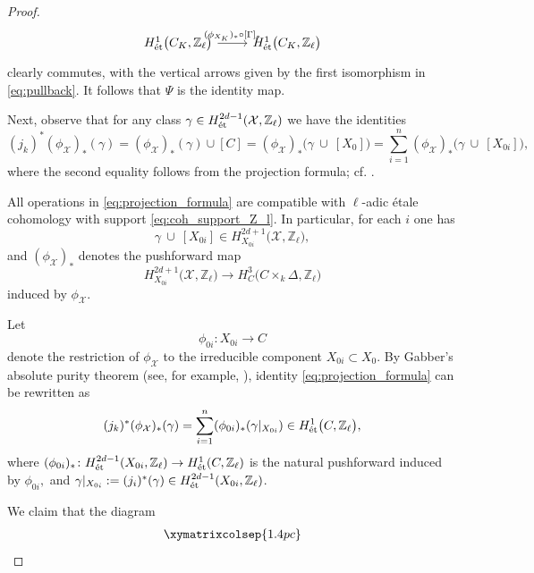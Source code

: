 \documentclass[11pt,letterpaper]{amsart}
\newcommand{\et}{\textnormal{\'et}}
\numberwithin{equation}{section}
\theoremstyle{definition}
\theoremstyle{remark}
\newcommand{\Z}{\mathbb{Z}}
\begin{document}
\begin{proof}
\begin{equation*}
\begin{tikzcd}
{H^{1}_{\et}\bigl(C_{K},\Z_\ell\bigr)} \arrow[r, "{(\phi_{X_{K}})_{\ast}\circ[\Gamma]_{\ast}}"] & {H^{1}_{\et}\bigl(C_{K},\Z_\ell\bigr)} \end{tikzcd}
\end{equation*}
clearly commutes, with the vertical arrows given by the first isomorphism in \eqref{eq:pullback}. It follows that $\Psi$ is the identity map.\par
Next, observe that for any class $\gamma\in H^{2d-1}_{\et}(\mathcal{X},\Z_\ell)$ we have the identities \begin{equation}\label{eq:projection_formula}(j_{k})^{\ast}(\phi_{\mathcal{X}})_{\ast}(\gamma)=(\phi_{\mathcal{X}})_{\ast}(\gamma)\cup[C]=(\phi_{\mathcal{X}})_{\ast}\bigl(\gamma\ \cup\ [X_{0}]\bigr)=\sum_{i=1}^{n}(\phi_{\mathcal{X}})_{\ast}\bigl(\gamma\ \cup\ [X_{0i}]\bigr),\end{equation}
where the second equality follows from the projection formula; cf. \cite[(1.3.3) and Example (2.1)]{Bloch-Ogus1974}.\par
All operations in \eqref{eq:projection_formula} are compatible with $\ell$-adic \'etale cohomology with support \eqref{eq:coh_support_Z_l}. In particular, for each $i$ one has  $$\gamma\ \cup\ [X_{0i}]\in H^{2d+1}_{X_{0i}}\bigl(\mathcal{X},\Z_\ell\bigr),$$ and $(\phi_{\mathcal{X}})_{\ast}$ denotes the pushforward map $$H^{2d+1}_{X_{0i}}\bigl(\mathcal{X},\Z_\ell\bigr)\longrightarrow H^{3}_{C}\bigl(C\times_{k}\Delta,\Z_\ell\bigr)$$ induced by $\phi_{\mathcal{X}}$.\par
Let $$\phi_{0i}\colon X_{0i}\longrightarrow C$$ denote the restriction of $\phi_{\mathcal{X}}$ to the irreducible component $X_{0i}\subset X_{0}$. By Gabber's absolute purity theorem (see, for example, \cite[Theorem 2.3.1]{ColliotSkoro2021}), identity \eqref{eq:projection_formula} can be rewritten as \begin{equation}\label{eq:projection_formula'}(j_{k})^{\ast}(\phi_{\mathcal{X}})_{\ast}(\gamma)=\sum_{i=1}^{n}(\phi_{0i})_{\ast}(\gamma|_{X_{0i}})\in H^{1}_{\et}\bigl(C,\Z_\ell\bigr),\end{equation}
where $(\phi_{0i})_{\ast}\colon H^{2d-1}_{\et}(X_{0i},\Z_\ell)\to H^{1}_{\et}(C,\Z_\ell)$ is the natural pushforward induced by $\phi_{0i},$ and $\gamma|_{X_{0i}}:=(j_{i})^{\ast}(\gamma)\in H^{2d-1}_{\et}(X_{0i},\Z_{\ell})$.\par
We claim that the diagram
\begin{align} \label{diagram:specialization}
\begin{split}
\xymatrixcolsep{1.4pc}

\end{split}
\end{align}
\end{proof}
\end{document}
